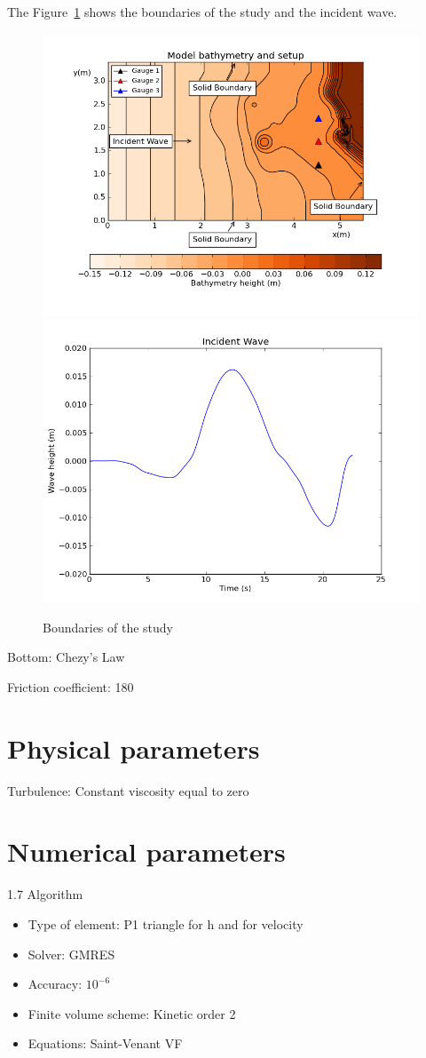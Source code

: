 The Figure~\ref{fig:monai:boundaries} shows the boundaries of the study and the incident wave.
\begin{figure}
\centering
\includegraphics[width=.6\textwidth]{img/boundaries.png}
\includegraphics[width=.6\textwidth]{img/wave.png}
\caption{Boundaries of the study}\label{fig:monai:boundaries}
\end{figure}

Bottom: Chezy's Law

Friction coefficient: 180

\section{Physical parameters}

Turbulence: Constant viscosity equal to zero

\section{Numerical parameters}
1.7 Algorithm
\begin{itemize}
\item Type of element: P1 triangle for h and for velocity
\item Solver:  GMRES
\item Accuracy:  $10^{-6}$
\item Finite volume scheme:  Kinetic order 2
\item Equations: Saint-Venant VF
\end{itemize}

